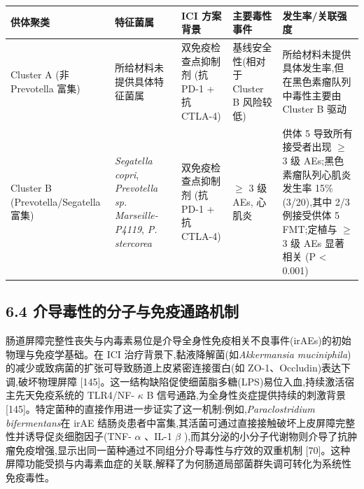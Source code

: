\documentclass[11pt]{article}
\newcounter{none}
\begin{document}
{\def\LTcaptype{none} %
\begin{longtable}[]{@{}
  >{\raggedright\arraybackslash}p{}
  >{\raggedright\arraybackslash}p{}
  >{\raggedright\arraybackslash}p{}
  >{\raggedright\arraybackslash}p{}
  >{\raggedright\arraybackslash}p{}@{}}
\toprule\noalign{}
\begin{minipage}[b]{\linewidth}\raggedright
供体聚类
\end{minipage} & \begin{minipage}[b]{\linewidth}\raggedright
特征菌属
\end{minipage} & \begin{minipage}[b]{\linewidth}\raggedright
ICI 方案背景
\end{minipage} & \begin{minipage}[b]{\linewidth}\raggedright
主要毒性事件
\end{minipage} & \begin{minipage}[b]{\linewidth}\raggedright
发生率/关联强度
\end{minipage} \\
\midrule\noalign{}
\endhead
\bottomrule\noalign{}
\endlastfoot
Cluster A (非 Prevotella 富集) & 所给材料未提供具体特征菌属 & 双免疫检查点抑制剂 (抗 PD-1 + 抗 CTLA-4) & 基线安全性(相对于 Cluster B 风险较低) & 所给材料未提供具体发生率,但在黑色素瘤队列中毒性主要由 Cluster B 驱动 \\
Cluster B (Prevotella/Segatella 富集) & \emph{Segatella copri}, \emph{Prevotella sp. Marseille-P4119}, \emph{P. stercorea} & 双免疫检查点抑制剂 (抗 PD-1 + 抗 CTLA-4) & \(\geq\) 3 级 AEs, 心肌炎 & 供体 5 导致所有接受者出现 \(\geq\) 3 级 AEs;黑色素瘤队列心肌炎发生率 15\% (3/20),其中 2/3 例接受供体 5 FMT;定植与 \(\geq\) 3 级 AEs 显著相关 (P \textless{} 0.001) \\
\end{longtable}
}

\subsection{6.4 介导毒性的分子与免疫通路机制}\label{ux4ecbux5bfcux6bd2ux6027ux7684ux5206ux5b50ux4e0eux514dux75abux901aux8defux673aux5236}

肠道屏障完整性丧失与内毒素易位是介导全身性免疫相关不良事件(irAEs)的初始物理与免疫学基础。在 ICI 治疗背景下,黏液降解菌(如\emph{Akkermansia muciniphila})的减少或致病菌的扩张可导致肠道上皮紧密连接蛋白(如 ZO-1、Occludin)表达下调,破坏物理屏障 {[}145{]}。这一结构缺陷促使细菌脂多糖(LPS)易位入血,持续激活宿主先天免疫系统的 TLR4/NF- \(\kappa\) B 信号通路,为全身性炎症提供持续的刺激背景 {[}145{]}。特定菌种的直接作用进一步证实了这一机制:例如,\emph{Paraclostridium bifermentans}在 irAE 结肠炎患者中富集,其活菌可通过直接接触破坏上皮屏障完整性并诱导促炎细胞因子(TNF- \(\alpha\) 、IL-1 \(\beta\) ),而其分泌的小分子代谢物则介导了抗肿瘤免疫增强,显示出同一菌种通过不同组分介导毒性与疗效的双重机制 {[}70{]}。这种屏障功能受损与内毒素血症的关联,解释了为何肠道局部菌群失调可转化为系统性免疫毒性。
\end{document}
